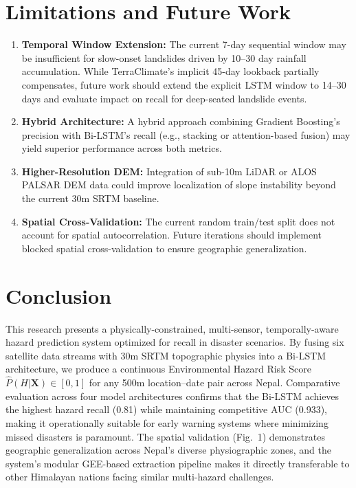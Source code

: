 \documentclass[journal,twoside]{IEEEtran}
\begin{document}
\section{Limitations and Future Work}
\begin{enumerate}
    \item \textbf{Temporal Window Extension:} The current 7-day sequential window may be insufficient for slow-onset landslides driven by 10--30 day rainfall accumulation. While TerraClimate's implicit 45-day lookback partially compensates, future work should extend the explicit LSTM window to 14--30 days and evaluate impact on recall for deep-seated landslide events.
    \item \textbf{Hybrid Architecture:} A hybrid approach combining Gradient Boosting's precision with Bi-LSTM's recall (e.g., stacking or attention-based fusion) may yield superior performance across both metrics.
    \item \textbf{Higher-Resolution DEM:} Integration of sub-10m LiDAR or ALOS PALSAR DEM data could improve localization of slope instability beyond the current 30m SRTM baseline.
    \item \textbf{Spatial Cross-Validation:} The current random train/test split does not account for spatial autocorrelation. Future iterations should implement blocked spatial cross-validation to ensure geographic generalization.
\end{enumerate}

\section{Conclusion}
This research presents a physically-constrained, multi-sensor, temporally-aware hazard prediction system optimized for recall in disaster scenarios. By fusing six satellite data streams with 30m SRTM topographic physics into a Bi-LSTM architecture, we produce a continuous Environmental Hazard Risk Score $\hat{P}(H | \mathbf{X}) \in [0,1]$ for any 500m location--date pair across Nepal. Comparative evaluation across four model architectures confirms that the Bi-LSTM achieves the highest hazard recall (0.81) while maintaining competitive AUC (0.933), making it operationally suitable for early warning systems where minimizing missed disasters is paramount. The spatial validation (Fig.~1) demonstrates geographic generalization across Nepal's diverse physiographic zones, and the system's modular GEE-based extraction pipeline makes it directly transferable to other Himalayan nations facing similar multi-hazard challenges.



\end{document}
